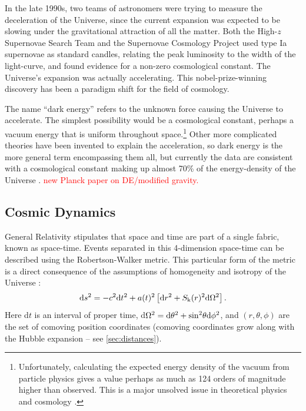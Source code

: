In the late 1990s, two teams of astronomers were trying to measure the deceleration of the Universe, since the current expansion was expected to be slowing under the gravitational attraction of all the matter. Both the High-$z$ Supernovae Search Team \citep{Riess98} and the Supernovae Cosmology Project \citep{Perlmutter99} used type Ia supernovae as standard candles, relating the peak luminosity to the width of the light-curve, and found evidence for a non-zero cosmological constant. The Universe's expansion was actually accelerating. This nobel-prize-winning discovery has been a paradigm shift for the field of cosmology.

The name ``dark energy'' refers to the unknown force causing the Universe to accelerate. The simplest possibility would be a cosmological constant, perhaps a vacuum energy that is uniform throughout space.\footnote{Unfortunately, calculating the expected energy density of the vacuum from particle physics gives a value perhaps as much as 124 orders of magnitude higher than observed. This is a major unsolved issue in theoretical physics and cosmology \citep{RydenText}.} Other more complicated theories have been invented to explain the acceleration, so dark energy is the more general term encompassing them all, but currently the data are consistent with a cosmological constant making up almost 70\% of the energy-density of the Universe \citep{PlanckXVI}. \textcolor{red}{new Planck paper on DE/modified gravity.}

\subsection{Cosmic Dynamics}
\label{sec:Dynamics}

General Relativity stipulates that space and time are part of a single fabric, known as space-time. Events separated in this 4-dimension space-time can be described using the Robertson-Walker metric. This particular form of the metric is a direct consequence of the assumptions of homogeneity and isotropy of the Universe \citep[e.g.][]{Bertone05}:
\begin{equation}
{\rm d}s^2 = -c^2 {\rm d}t^2 +a(t)^2 \left[{\rm d}r^2 + S_{\rm k}(r)^2{\rm d}\Omega^2\right].
\label{eq:metric}
\end{equation}
Here d$t$ is an interval of proper time, d$\Omega^2 = {\rm d}\theta^2 + {\rm sin}^2\theta {\rm d}\phi^2$, and $(r,\theta,\phi)$ are the set of comoving position coordinates (comoving coordinates grow along with the Hubble expansion -- see \autoref{sec:distances}). 

